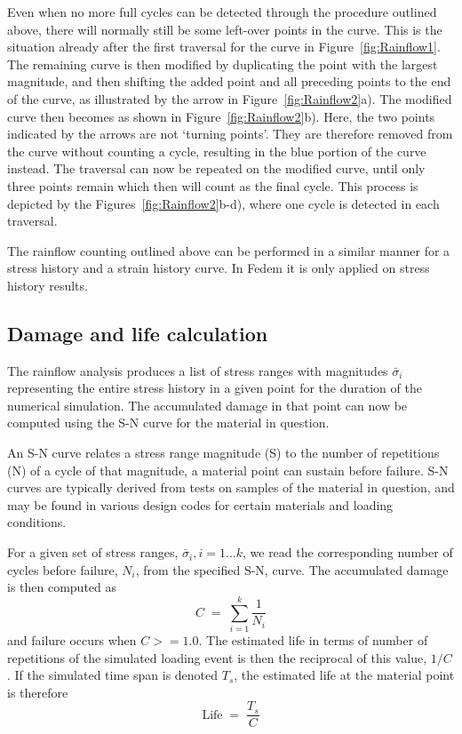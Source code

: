 Even when no more full cycles can be detected through the procedure outlined
above, there will normally still be some left-over points in the curve.
This is the situation already after the first traversal for the curve in
Figure~\ref{fig:Rainflow1}.
The remaining curve is then modified by duplicating the point with the largest
magnitude, and then shifting the added point and all preceding points to the
end of the curve, as illustrated by the arrow in Figure~\ref{fig:Rainflow2}a).
The modified curve then becomes as shown in Figure~\ref{fig:Rainflow2}b).
Here, the two points indicated by the arrows are not `turning points'.
They are therefore removed from the curve without counting a cycle, resulting
in the blue portion of the curve instead.
The traversal can now be repeated on the modified curve, until only three
points remain which then will count as the final cycle.
This process is depicted by the Figures~\ref{fig:Rainflow2}b-d),
where one cycle is detected in each traversal.

The rainflow counting outlined above can be performed in a similar manner for a
stress history and a strain history curve.
In Fedem it is only applied on stress history results.

\subsection{Damage and life calculation}

The rainflow analysis produces a list of stress ranges with magnitudes
$\bar{\sigma}_i$ representing the entire stress history in a given point for
the duration of the numerical simulation.
The accumulated damage in that point can now be computed using the S-N curve for
the material in question.

An S-N curve relates a stress range magnitude (S) to the number of repetitions
(N) of a cycle of that magnitude, a material point can sustain before failure.
S-N curves are typically derived from tests on samples of the material in
question, and may be found in various design codes for certain materials and
loading conditions.

For a given set of stress ranges, $\bar{\sigma}_i, i=1 \ldots k$, we read the
corresponding number of cycles before failure, $N_i$, from the specified
S-N, curve.
The accumulated damage is then computed as
%
\begin{equation}
C \;=\; \sum_{i=1}^k\frac{1}{N_i}
\end{equation}
%
and failure occurs when $C>=1.0$.
The estimated life in terms of number of repetitions of the simulated loading
event is then the reciprocal of this value, $1/C$.
If the simulated time span is denoted $T_s$, the estimated life at the
material point is therefore
%
\begin{equation}
\text{Life} \;=\; \frac{T_s}{C}
\end{equation}
